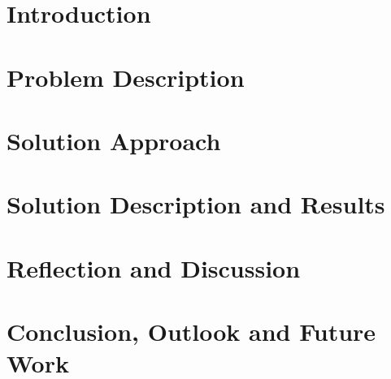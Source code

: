 
\section{Introduction} \label{sec:intro}


\section{Problem Description} \label{sec:probdesc}


\section{Solution Approach} \label{sec:solapp}


\section{Solution Description and Results} \label{sec:soldesc}


\section{Reflection and Discussion} \label{sec:reflect}


\section{Conclusion, Outlook and Future Work} \label{sec:conclusion}



\nocite{*}

\label{sec:ref}
\label{EndOfMainMatter}
\newpage

